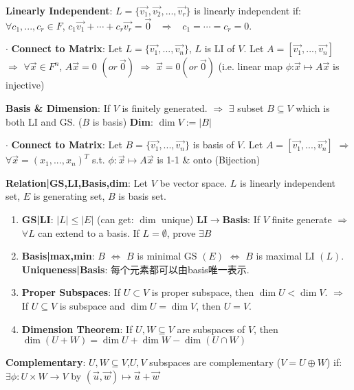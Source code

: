 \documentclass[9pt]{article}
\begin{document}
\textbf{Linearly Independent}: $L=\{\vec{v_1},\vec{v_2},...,\vec{v_r}\}$ is linearly independent if: \ $\forall c_1,...,c_r\in F$, $c_1\vec{v_1}+\cdots+c_r\vec{v_r}=\vec{0}$ \ $\Rightarrow$ \ $c_1=\cdots =c_r=0$.

$\cdot$ \textbf{Connect to Matrix}: {\footnotesize Let $L=\{\vec{v_1},...,\vec{v_n}\}$, $L$ is LI of $V$. Let $A=[\vec{v_1},...,\vec{v_n}]$ $\Rightarrow$ $\forall\vec{x}\in F^n$, $A\vec{x}=0$ $(or \ \vec{0})$ $\Rightarrow$ $\vec{x}=0 (or \ \vec{0})$ (i.e. linear map $\phi$:$\vec{x}\mapsto A\vec{x}$ is injective)}

\textbf{Basis \& Dimension}: If $V$ is finitely generated. $\Rightarrow$ $\exists$ subset $B\subseteq V$ which is both LI and GS. ($B$ is basis) \quad \textbf{Dim}: $\dim V:=|B|$

$\cdot$ \textbf{Connect to Matrix}: {\footnotesize Let $B=\{\vec{v_1},...,\vec{v_n}\}$ is basis of $V$. Let $A=[\vec{v_1},...,\vec{v_n}]$ $\Rightarrow$ $\forall\vec{x}=(x_1,...,x_n)^T$ s.t. $\phi:\vec{x}\mapsto A\vec{x}$ is 1-1 \& onto (Bijection)}

\textbf{Relation|GS,LI,Basis,dim}: {\small Let $V$ be vector space. $L$ is linearly independent set, $E$ is generating set, $B$ is basis set.}

\begin{enumerate}[itemsep=-2pt, topsep=-2pt]
    \item \textbf{GS|LI}: $|L|\leq|E|$ {\scriptsize (can get: $\dim$ unique)} \quad \textbf{LI$\to$Basis}: If $V$ finite generate $\Rightarrow$ $\forall L$ can extend to a basis. {\scriptsize If $L=\emptyset$, prove $\exists B$}
    \item \textbf{Basis|max,min}: $B$ $\Leftrightarrow$ $B$ is minimal GS $(E)$ $\Leftrightarrow$ $B$ is maximal LI $(L)$. \quad \textbf{Uniqueness|Basis}: {\small 每个元素都可以由basis唯一表示.}
    \item \textbf{Proper Subspaces}: {\small If $U\subset V$ is proper subspace, then $\dim U<\dim V$. \quad $\Rightarrow$ \quad If $U\subseteq V$ is subspace and $\dim U=\dim V$, then $U=V$.}
    \item \textbf{Dimension Theorem}: If $U,W\subseteq V$ are subspaces of $V$, then $\dim(U+W)=\dim U+\dim W-\dim(U\cap W)$
\end{enumerate}

\textbf{Complementary}: $U,W\subseteq V$,$U,V$ subspaces are complementary ($V=U\oplus W$) if: \quad $\exists\phi:U\times W\to V$ by $(\vec{u},\vec{w})\mapsto\vec{u}+\vec{w}$
\end{document}
